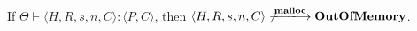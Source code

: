
\begin{lemma}
\label{lem:immediateSafety}
If \( \Theta \vdash \langle H, R, s, n, C \rangle :
\langle P, C \rangle\), then \(\langle H, R, s, n, C \rangle
\not\xlongrightarrow{\Malloc} \OVERFLOW \).
\end{lemma}
